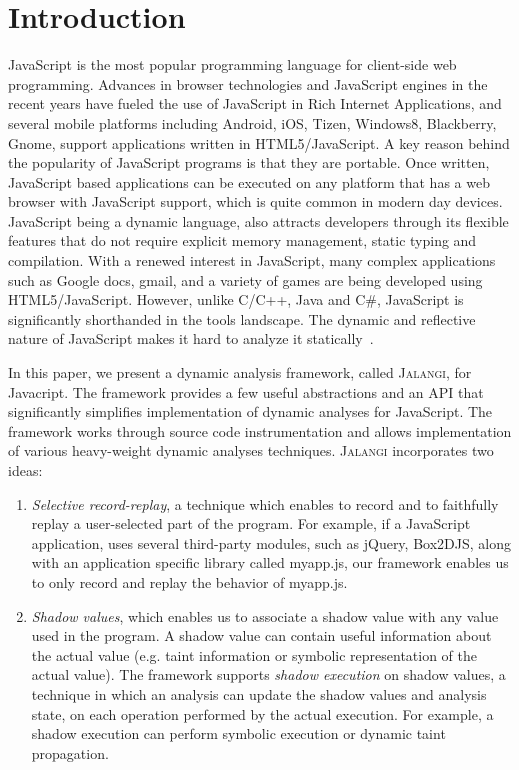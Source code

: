 \documentclass{sig-alternate}
\def\jalangi{\textsc{Jalangi}}
\begin{document}
\section{Introduction}

JavaScript is the most popular programming language for client-side
web programming. Advances in browser technologies and JavaScript
engines in the recent years have fueled the use of JavaScript in Rich
Internet Applications, and several mobile platforms including Android,
iOS, Tizen, Windows8, Blackberry, Gnome, support applications written
in HTML5/JavaScript. A key reason behind the popularity of JavaScript
programs is that they are portable. Once written, JavaScript based
applications can be executed on any platform that has a web browser
with JavaScript support, which is quite common in modern day devices.
JavaScript being a dynamic language, also attracts developers through
its flexible features that do not require explicit memory management,
static typing and compilation.  With a renewed interest in JavaScript,
many complex applications such as Google docs, gmail, and a variety of
games are being developed using HTML5/JavaScript. However, unlike
C/C++, Java and C\#, JavaScript is significantly shorthanded in the
tools landscape. The dynamic and reflective nature of JavaScript makes
it hard to analyze it
statically~\cite{Richards:2010:ADB:1806596.1806598,Wei:2012:BAJ:2384716.2384758,Ratanaworabhan:2010:JCB:1863166.1863169}.

In this paper, we present a dynamic analysis framework, called
\jalangi{}, for Javacript.  The framework provides a few useful
abstractions and an API that significantly simplifies implementation
of dynamic analyses for JavaScript.  The framework works through
source code instrumentation and allows implementation of various
heavy-weight dynamic analyses techniques.  \jalangi{} incorporates two
ideas:

\begin{enumerate}
\item \emph{Selective record-replay}, a technique which enables to record and
  to faithfully replay a user-selected part of the program.  For
  example, if a JavaScript application, uses several third-party
  modules, such as jQuery, Box2DJS, along with an application specific
  library called myapp.js, our framework enables us to only record and
  replay the behavior of myapp.js.
\item\emph{ Shadow values}, which enables us to associate a shadow
  value with any value used in the program.  A shadow value can
  contain useful information about the actual value (e.g. taint
  information or symbolic representation of the actual value).  The
  framework supports \emph{shadow execution} on shadow values, a
  technique in which an analysis can update the shadow values and
  analysis state, on each operation performed by the actual execution.
  For example, a shadow execution can perform symbolic execution or
  dynamic taint propagation.
\end{enumerate}
\end{document}
